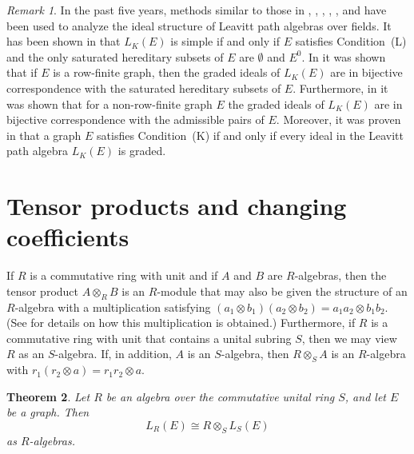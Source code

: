 \documentclass[11pt]{amsart}
\newtheorem{theorem}{Theorem}[section]
\theoremstyle{remark}
\newtheorem{remark}[theorem]{Remark}
\numberwithin{equation}{section}
\begin{document}
\begin{remark}
In the past five years, methods similar to those in \cite{CK}, \cite{C2}, \cite{aHR}, \cite{BPRS}, \cite{BHRS}, and \cite{DT1} have been used to analyze the ideal structure of Leavitt path algebras over fields.  It has been shown in \cite[Theorem~3.11]{AbrPino} that $L_K(E)$ is simple if and only if $E$ satisfies Condition~(L) and the only saturated hereditary subsets of $E$ are $\emptyset$ and $E^0$.  In \cite[Theorem~5.3]{AMP} it was shown that if $E$ is a row-finite graph, then the graded ideals of $L_K(E)$ are in bijective correspondence with the saturated hereditary subsets of $E$.  Furthermore, in \cite[Theorem~5.7]{Tom10} it was shown that for a non-row-finite graph $E$ the graded ideals of $L_K(E)$ are in bijective correspondence with the admissible pairs of $E$.  Moreover, it was proven in \cite[Theorem~6.16]{Tom10} that a graph $E$ satisfies Condition~(K) if and only if every ideal in the Leavitt path algebra $L_K(E)$ is graded.
\end{remark}


\section{Tensor products and changing coefficients} \label{tensor-sec}

If $R$ is a commutative ring with unit and if $A$ and $B$ are $R$-algebras, then the tensor product $A \otimes_R B$ is an $R$-module that may also be given the structure of an $R$-algebra with a multiplication satisfying $(a_1 \otimes b_1) (a_2 \otimes b_2) = a_1 a_2 \otimes b_1 b_2$.  (See \cite[Ch.IV, Theorem~7.4]{Hun} for details on how this multiplication is obtained.) Furthermore, if $R$ is a commutative ring with unit that contains a unital subring $S$, then we may view $R$ as an $S$-algebra.  If, in addition, $A$ is an $S$-algebra, then $R \otimes_S A$ is an $R$-algebra with $r_1 (r_2 \otimes a) = r_1r_2 \otimes a$.

\begin{theorem} \label{change-coefficients}
Let $R$ be an algebra over the commutative unital ring $S$, and let $E$ be a graph.  Then $$L_R(E) \cong R \otimes_S L_S(E)$$ as $R$-algebras.
\end{theorem}
\end{document}
